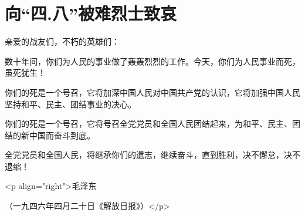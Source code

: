 \section[向“四.八”被难烈士致哀（一九四六年四月二十日）]{向“四.八”被难烈士致哀}


亲爱的战友们，不朽的英雄们：

数十年间，你们为人民的事业做了轰轰烈烈的工作。今天，你们为人民事业而死，虽死犹生！

你们的死是一个号召，它将加深中国人民对中国共产党的认识，它将加强中国人民坚持和平、民主、团结事业的决心。

你们的死是一个号召，它将号召全党党员和全国人民团结起来，为和平、民主、团结的新中国而奋斗到底。

全党党员和全国人民，将继承你们的遗志，继续奋斗，直到胜利，决不懈怠，决不退缩！

<p align="right">毛泽东

（一九四六年四月二十日《解放日报》）</p>

